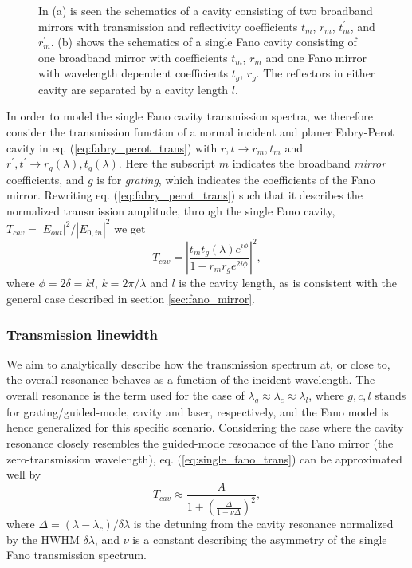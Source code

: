 \begin{figure}[h!]
\begin{subfigure}[b]{0.3\textwidth}
        \caption{}
        \label{fig:single_fano_sketch}
    \end{subfigure}
    \caption{In (a) is seen the schematics of a cavity consisting of two broadband mirrors with transmission and reflectivity coefficients $t_m$, $r_m$, $t_m^{\prime}$, and $r_m^{\prime}$. (b) shows the schematics of a single Fano cavity consisting of one broadband mirror with coefficients $t_m$, $r_m$ and one Fano mirror with wavelength dependent coefficients $t_g$, $r_g$. The reflectors in either cavity are separated by a cavity length $l$.}
    \label{fig:broadband_and_single_fano_sketch}
\end{figure}

In order to model the single Fano cavity transmission spectra, we therefore consider the transmission function of a normal incident and planer Fabry-Perot cavity in eq. (\ref{eq:fabry_perot_trans}) with $r,t \rightarrow r_m,t_m$ and $r^{\prime},t^{\prime} \rightarrow r_g(\lambda),t_g(\lambda)$\cite{Naesby}. Here the subscript $m$ indicates the broadband \emph{mirror} coefficients, and $g$ is for \emph{grating}, which indicates the coefficients of the Fano mirror. Rewriting eq. (\ref{eq:fabry_perot_trans}) such that it describes the normalized transmission amplitude, through the single Fano cavity, $T_{cav} = |E_{out}|^2/|E_{0,in}|^2$ we get
\begin{equation}
    T_{cav} = \left|\frac{t_m t_g(\lambda) e^{i\phi}}{1 - r_m r_g e^{2i\phi}}\right|^2,
    \label{eq:single_fano_trans}
\end{equation}
where $\phi = 2\delta = kl$, $k=2 \pi / \lambda$ and $l$ is the cavity length, as is consistent with the general case described in section \ref{sec:fano_mirror}.

\subsubsection{Transmission linewidth}\label{sec:single_fano_cavity_trans_linewidth}

We aim to analytically describe how the transmission spectrum at, or close to, the overall resonance behaves as a function of the incident wavelength. The overall resonance is the term used for the case of $\lambda_g \approx \lambda_c \approx \lambda_l$, where $g,c,l$ stands for grating/guided-mode, cavity and laser, respectively, and the Fano model is hence generalized for this specific scenario. Considering the case where the cavity resonance closely resembles the guided-mode resonance of the Fano mirror (the zero-transmission wavelength), eq. (\ref{eq:single_fano_trans}) can be approximated well by
\begin{equation}
    T_{cav} \approx \frac{A}{1 + \left( \frac{\Delta}{1 - \nu \Delta} \right)^2},
    \label{eq:general_fano_model}
\end{equation}
where $\Delta = (\lambda - \lambda_c) / \delta \lambda$ is the detuning from the cavity resonance normalized by the HWHM $\delta \lambda$, and $\nu$ is a constant describing the asymmetry of the single Fano transmission spectrum. \cite{Mitra}\cite{Darki} 

